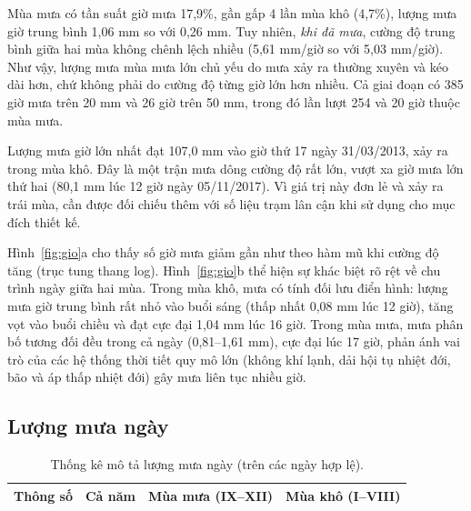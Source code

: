 Mùa mưa có tần suất giờ mưa 17,9\%, gần gấp 4 lần mùa khô (4,7\%), lượng mưa giờ trung bình 1,06 mm so với 0,26 mm. Tuy nhiên, \emph{khi đã mưa}, cường độ trung bình giữa hai mùa không chênh lệch nhiều (5,61 mm/giờ so với 5,03 mm/giờ). Như vậy, lượng mưa mùa mưa lớn chủ yếu do mưa xảy ra thường xuyên và kéo dài hơn, chứ không phải do cường độ từng giờ lớn hơn nhiều. Cả giai đoạn có 385 giờ mưa trên 20 mm và 26 giờ trên 50 mm, trong đó lần lượt 254 và 20 giờ thuộc mùa mưa.

Lượng mưa giờ lớn nhất đạt 107,0 mm vào giờ thứ 17 ngày 31/03/2013, xảy ra trong mùa khô. Đây là một trận mưa dông cường độ rất lớn, vượt xa giờ mưa lớn thứ hai (80,1 mm lúc 12 giờ ngày 05/11/2017). Vì giá trị này đơn lẻ và xảy ra trái mùa, cần được đối chiếu thêm với số liệu trạm lân cận khi sử dụng cho mục đích thiết kế.


Hình~\ref{fig:gio}a cho thấy số giờ mưa giảm gần như theo hàm mũ khi cường độ tăng (trục tung thang log). Hình~\ref{fig:gio}b thể hiện sự khác biệt rõ rệt về chu trình ngày giữa hai mùa. Trong mùa khô, mưa có tính đối lưu điển hình: lượng mưa giờ trung bình rất nhỏ vào buổi sáng (thấp nhất 0,08 mm lúc 12 giờ), tăng vọt vào buổi chiều và đạt cực đại 1,04 mm lúc 16 giờ. Trong mùa mưa, mưa phân bố tương đối đều trong cả ngày (0,81--1,61 mm), cực đại lúc 17 giờ, phản ánh vai trò của các hệ thống thời tiết quy mô lớn (không khí lạnh, dải hội tụ nhiệt đới, bão và áp thấp nhiệt đới) gây mưa liên tục nhiều giờ.

\subsection{Lượng mưa ngày}

\begin{table}[H]
  \centering
  \caption{Thống kê mô tả lượng mưa ngày (trên các ngày hợp lệ).}
  \label{tab:ngay}
  \small
  \begin{tabularx}{\linewidth}{|>{\raggedright\arraybackslash}p{5.2cm}|Y|Y|Y|}
    \hline
    \textbf{Thông số} & \textbf{Cả năm} & \textbf{Mùa mưa (IX--XII)} & \textbf{Mùa khô (I--VIII)} \\
    \hline
    
  \end{tabularx}
\end{table}

